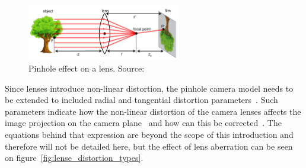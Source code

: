 
\begin{figure}[H]
	\centering
	\includegraphics[width=0.6\textwidth]{img/camera/pinhole_with_lense.png}
	\caption{Pinhole effect on a lens. Source:~\cite{camera_models}}
	\label{fig:pinhole_with_lense}
\end{figure}

Since lenses introduce non-linear distortion, the pinhole camera model needs to be extended to included radial and tangential distortion parameters~\cite{Bouguet2010, manuapphotogrammetry, Heikkila1997}. Such parameters indicate how the non-linear distortion of the camera lenses affects the image projection on the camera plane~\cite{camera_models, Sturm2010} and how can this be corrected~\cite{Heikkila1997, Bouguet2010, opencv_doc}. The equations behind that expression are beyond the scope of this introduction and therefore will not be detailed here, but the effect of lens aberration can be seen on figure~\ref{fig:lense_distortion_types}.

